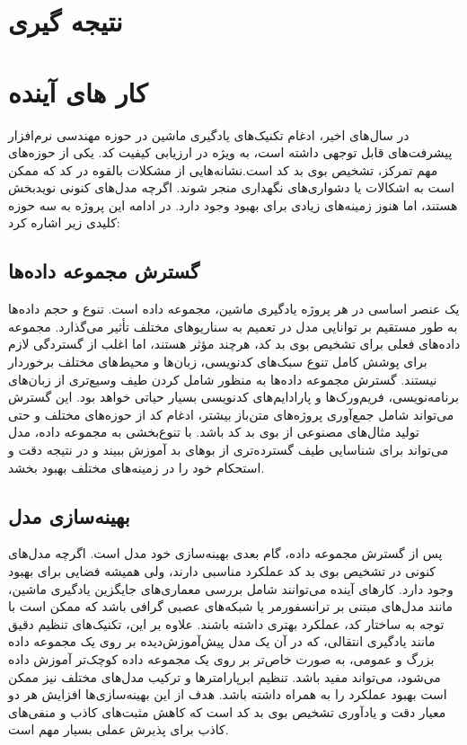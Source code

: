 
\section{نتیجه گیری}
\section{کار های آینده}

در سال‌های اخیر، ادغام تکنیک‌های یادگیری ماشین در حوزه مهندسی نرم‌افزار پیشرفت‌های قابل توجهی داشته است، به ویژه در ارزیابی کیفیت کد. یکی از حوزه‌های مهم تمرکز، تشخیص بوی بد کد است.نشانه‌هایی از مشکلات بالقوه در کد که ممکن است به اشکالات یا دشواری‌های نگهداری منجر شوند. اگرچه مدل‌های کنونی نویدبخش هستند، اما هنوز زمینه‌های زیادی برای بهبود وجود دارد. در ادامه این پروژه به سه حوزه کلیدی زیر اشاره کرد:

\subsection{گسترش مجموعه داده‌ها}
یک عنصر اساسی در هر پروژه یادگیری ماشین، مجموعه داده است. تنوع و حجم داده‌ها به طور مستقیم بر توانایی مدل در تعمیم به سناریوهای مختلف تأثیر می‌گذارد. مجموعه داده‌های فعلی برای تشخیص بوی بد کد، هرچند مؤثر هستند، اما اغلب از گستردگی لازم برای پوشش کامل تنوع سبک‌های کدنویسی، زبان‌ها و محیط‌های مختلف برخوردار نیستند. گسترش مجموعه داده‌ها به منظور شامل کردن طیف وسیع‌تری از زبان‌های برنامه‌نویسی، فریم‌ورک‌ها و پارادایم‌های کدنویسی بسیار حیاتی خواهد بود. این گسترش می‌تواند شامل جمع‌آوری پروژه‌های متن‌باز بیشتر، ادغام کد از حوزه‌های مختلف و حتی تولید مثال‌های مصنوعی از بوی بد کد باشد. با تنوع‌بخشی به مجموعه داده، مدل می‌تواند برای شناسایی طیف گسترده‌تری از بوهای بد آموزش ببیند و در نتیجه دقت و استحکام خود را در زمینه‌های مختلف بهبود بخشد.

\subsection{بهینه‌سازی مدل}

پس از گسترش مجموعه داده، گام بعدی بهینه‌سازی خود مدل است. اگرچه مدل‌های کنونی در تشخیص بوی بد کد عملکرد مناسبی دارند، ولی همیشه فضایی برای بهبود وجود دارد. کارهای آینده می‌توانند شامل بررسی معماری‌های جایگزین یادگیری ماشین، مانند مدل‌های مبتنی بر ترانسفورمر یا شبکه‌های عصبی گرافی باشد که ممکن است با توجه به ساختار کد، عملکرد بهتری داشته باشند. علاوه بر این، تکنیک‌های تنظیم دقیق مانند یادگیری انتقالی، که در آن یک مدل پیش‌آموزش‌دیده بر روی یک مجموعه داده بزرگ و عمومی، به صورت خاص‌تر بر روی یک مجموعه داده کوچک‌تر آموزش داده می‌شود، می‌تواند مفید باشد. تنظیم ابرپارامترها و ترکیب مدل‌های مختلف نیز ممکن است بهبود عملکرد را به همراه داشته باشد. هدف از این بهینه‌سازی‌ها افزایش هر دو معیار دقت و یادآوری تشخیص بوی بد کد است که کاهش مثبت‌های کاذب و منفی‌های کاذب برای پذیرش عملی بسیار مهم است.

